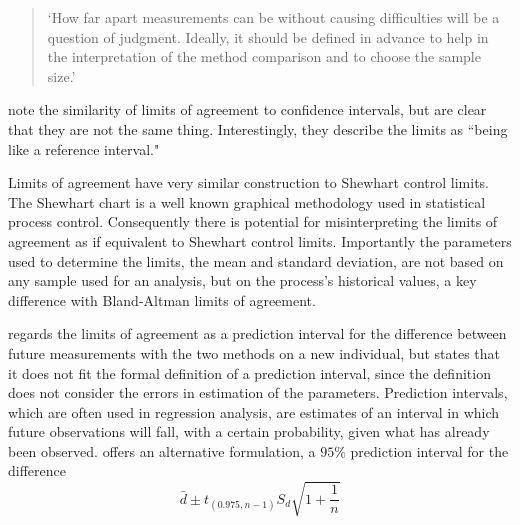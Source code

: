 \documentclass[12pt, a4paper]{report}
\theoremstyle{plain}
\theoremstyle{definition}
\theoremstyle{remark}
\begin{document}
	\begin{quote}
		`How far apart measurements can be without causing difficulties
		will be a question of judgment. Ideally, it should be defined in
		advance to help in the interpretation of the method comparison and
		to choose the sample size.'\citep{BA86}
	\end{quote}
	
	\citet{BA99} note the similarity of limits of agreement to
	confidence intervals, but are clear that they are not the same
	thing. Interestingly, they describe the limits as ``being like a
	reference interval."
	
	Limits of agreement have very similar construction to Shewhart
	control limits. The Shewhart chart is a well known graphical
	methodology used in statistical process control. Consequently
	there is potential for misinterpreting the limits of agreement as
	if equivalent to Shewhart control limits. Importantly the
	parameters used to determine the limits, the mean and standard
	deviation, are not based on any sample used for an analysis, but
	on the process's historical values, a key difference with
	Bland-Altman limits of agreement.
	
	\citet{BXC2008} regards the limits of agreement as a prediction
	interval for the difference between future measurements with the
	two methods on a new individual, but states that it does not fit
	the formal definition of a prediction interval, since the
	definition does not consider the errors in estimation of the
	parameters. Prediction intervals, which are often used in
	regression analysis, are estimates of an interval in which future
	observations will fall, with a certain probability, given what has
	already been observed. \citet{BXC2008} offers an alternative
	formulation, a $95\%$ prediction interval for the difference
	\begin{equation}
	\bar{d} \pm t_{(0.975, n-1)}S_{d} \sqrt{1+\frac{1}{n}}
	\end{equation}
	
\end{document}
